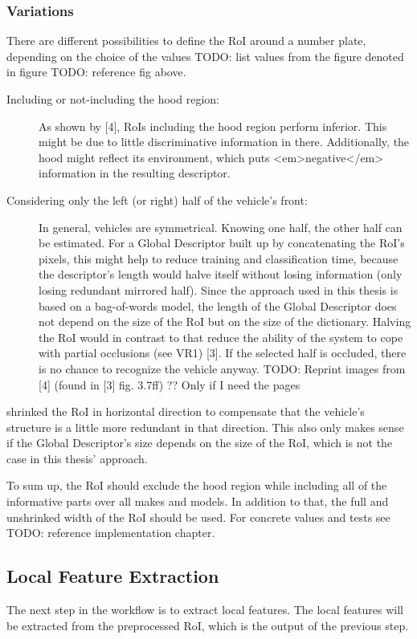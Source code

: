 \subsubsection{Variations}
There are different possibilities to define the RoI around a number plate, depending on the choice of the values TODO: list values from the figure denoted in figure TODO: reference fig above.

\begin{description}
  \item[Including or not-including the hood region:] As shown by [4], RoIs including the hood region perform inferior. This might be due to little discriminative information in there. Additionally, the hood might reflect its environment, which puts <em>negative</em> information in the resulting descriptor.
  \item[Considering only the left (or right) half of the vehicle's front:] In general, vehicles are symmetrical. Knowing one half, the other half can be estimated. For a Global Descriptor built up by concatenating the RoI’s pixels, this might help to reduce training and classification time, because the descriptor’s length would halve itself without losing information (only losing redundant mirrored half). Since the approach used in this thesis is based on a bag-of-words model, the length of the Global Descriptor does not depend on the size of the RoI but on the size of the dictionary. Halving the RoI would in contrast to that reduce the ability of the system to cope with partial occlusions (see VR1) [3]. If the selected half is occluded, there is no chance to recognize the vehicle anyway. TODO: Reprint images from [4] (found in [3] fig. 3.7ff) ?? Only if I need the pages
\end{description}
\citeauthor{petrovic2004analysis} \citep{petrovic2004analysis} shrinked the RoI in horizontal direction to compensate that the vehicle's structure is a little more redundant in that direction. This also only makes sense if the Global Descriptor's size depends on the size of the RoI, which is not the case in this thesis' approach.

To sum up, the RoI should exclude the hood region while including all of the informative parts over all makes and models. In addition to that, the full and unshrinked width of the RoI should be used. For concrete values and tests see TODO: reference implementation chapter.

\subsection{Local Feature Extraction}
The next step in the workflow is to extract local features. The local features will be extracted from the preprocessed RoI, which is the output of the previous step.

